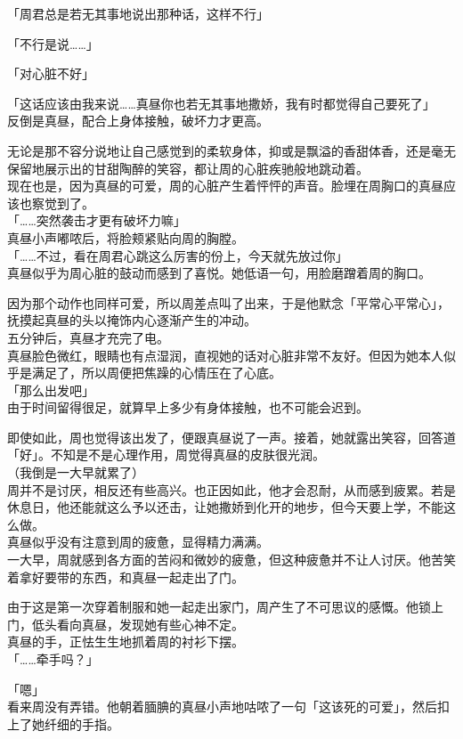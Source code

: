 「周君总是若无其事地说出那种话，这样不行」

「不行是说……」

「对心脏不好」

「这话应该由我来说……真昼你也若无其事地撒娇，我有时都觉得自己要死了」\\

反倒是真昼，配合上身体接触，破坏力才更高。

无论是那不容分说地让自己感觉到的柔软身体，抑或是飘溢的香甜体香，还是毫无保留地展示出的甘甜陶醉的笑容，都让周的心脏疾驰般地跳动着。\\

现在也是，因为真昼的可爱，周的心脏产生着怦怦的声音。脸埋在周胸口的真昼应该也察觉到了。\\

「……突然袭击才更有破坏力嘛」\\

真昼小声嘟哝后，将脸颊紧贴向周的胸膛。\\

「……不过，看在周君心跳这么厉害的份上，今天就先放过你」\\

真昼似乎为周心脏的鼓动而感到了喜悦。她低语一句，用脸磨蹭着周的胸口。

因为那个动作也同样可爱，所以周差点叫了出来，于是他默念「平常心平常心」，抚摸起真昼的头以掩饰内心逐渐产生的冲动。\\

五分钟后，真昼才充完了电。\\

真昼脸色微红，眼睛也有点湿润，直视她的话对心脏非常不友好。但因为她本人似乎是满足了，所以周便把焦躁的心情压在了心底。\\

「那么出发吧」\\

由于时间留得很足，就算早上多少有身体接触，也不可能会迟到。

即使如此，周也觉得该出发了，便跟真昼说了一声。接着，她就露出笑容，回答道「好」。不知是不是心理作用，周觉得真昼的皮肤很光润。\\

（我倒是一大早就累了）\\

周并不是讨厌，相反还有些高兴。也正因如此，他才会忍耐，从而感到疲累。若是休息日，他还能就这么予以还击，让她撒娇到化开的地步，但今天要上学，不能这么做。\\

真昼似乎没有注意到周的疲惫，显得精力满满。\\

一大早，周就感到各方面的苦闷和微妙的疲惫，但这种疲惫并不让人讨厌。他苦笑着拿好要带的东西，和真昼一起走出了门。

由于这是第一次穿着制服和她一起走出家门，周产生了不可思议的感慨。他锁上门，低头看向真昼，发现她有些心神不定。\\

真昼的手，正怯生生地抓着周的衬衫下摆。\\

「……牵手吗？」

「嗯」\\

看来周没有弄错。他朝着腼腆的真昼小声地咕哝了一句「这该死的可爱」，然后扣上了她纤细的手指。
